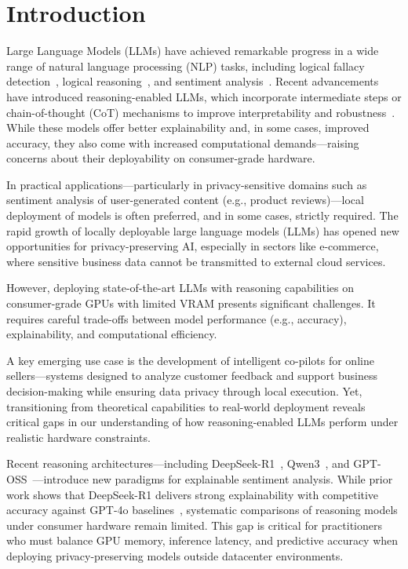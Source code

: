 \documentclass[conference]{IEEEtran}
\begin{document}
\section{Introduction}

Large Language Models (LLMs) have achieved remarkable progress in a wide range of natural language processing (NLP) tasks, including logical fallacy detection~\cite{teo2025large}, logical reasoning~\cite{huang2025logical}, and sentiment analysis~\cite{wang2025review,huang2025explainable}. Recent advancements have introduced reasoning-enabled LLMs, which incorporate intermediate steps or chain-of-thought (CoT) mechanisms to improve interpretability and robustness~\cite{wei2022chain,feng2023towards}. While these models offer better explainability and, in some cases, improved accuracy, they also come with increased computational demands—raising concerns about their deployability on consumer-grade hardware.

In practical applications—particularly in privacy-sensitive domains such as sentiment analysis of user-generated content (e.g., product reviews)—local deployment of models is often preferred, and in some cases, strictly required. The rapid growth of locally deployable large language models (LLMs) has opened new opportunities for privacy-preserving AI, especially in sectors like e-commerce, where sensitive business data cannot be transmitted to external cloud services.

However, deploying state-of-the-art LLMs with reasoning capabilities on consumer-grade GPUs with limited VRAM presents significant challenges. It requires careful trade-offs between model performance (e.g., accuracy), explainability, and computational efficiency.

A key emerging use case is the development of intelligent co-pilots for online sellers—systems designed to analyze customer feedback and support business decision-making while ensuring data privacy through local execution. Yet, transitioning from theoretical capabilities to real-world deployment reveals critical gaps in our understanding of how reasoning-enabled LLMs perform under realistic hardware constraints.

Recent reasoning architectures—including DeepSeek-R1~\cite{guo2025deepseek}, Qwen3~\cite{yang2025qwen3}, and GPT-OSS~\cite{gptoss2025}—introduce new paradigms for explainable sentiment analysis. 
While prior work shows that DeepSeek-R1 delivers strong explainability with competitive accuracy against GPT-4o baselines~\cite{huang2025explainable}, systematic comparisons of reasoning models under consumer hardware remain limited. 
This gap is critical for practitioners who must balance GPU memory, inference latency, and predictive accuracy when deploying privacy-preserving models outside datacenter environments.
\end{document}
